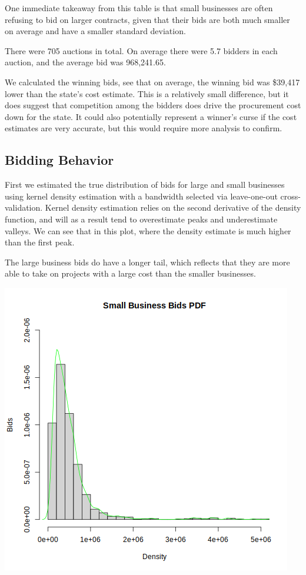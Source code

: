 One immediate takeaway from this table is that small businesses are often
refusing to bid on larger contracts, given that their bids are both
much smaller on average and have a smaller standard deviation.

There were 705 auctions in total. On average there were 5.7 bidders in
each auction, and the average bid was 968,241.65.

We calculated the winning bids, see that on average, the winning bid was \$39,417 lower
than the state's cost estimate. This is a relatively small difference,
but it does suggest that competition among the bidders does drive the
procurement cost down for the state. It could also potentially
represent a winner's curse if the cost estimates are very accurate,
but this would require more analysis to confirm.

\subsection{Bidding Behavior}

%

First we estimated the true distribution of bids for large and
small businesses using kernel density estimation with a bandwidth
selected via leave-one-out cross-validation.
Kernel density estimation relies on the second derivative of the
density function, and will as a result tend to overestimate peaks and
underestimate valleys. We can see that in this plot, where
the density estimate is much higher than the first peak.

The large business bids do have a longer tail, which reflects that
they are more able to take on projects with a large cost than
the smaller businesses.

\includegraphics[scale=0.75]{sb-pdf.png}

